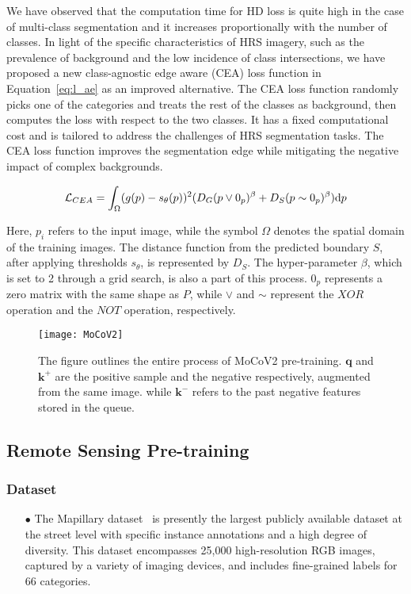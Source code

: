 \documentclass[journal]{IEEEtran}
\begin{document}
We have observed that the computation time for HD loss is quite high in the case of multi-class segmentation and it increases proportionally with the number of classes. In light of the specific characteristics of HRS imagery, such as the prevalence of background and the low incidence of class intersections, we have proposed a new class-agnostic edge aware (CEA) loss function in Equation~\ref{eq:l_ae} as an improved alternative. The CEA loss function randomly picks one of the categories and treats the rest of the classes as background, then computes the loss with respect to the two classes. It has a fixed computational cost and is tailored to address the challenges of HRS segmentation tasks. The CEA loss function improves the segmentation edge while mitigating the negative impact of complex backgrounds.

\begin{equation}
\small
    \mathcal{L}_{CEA} = \int_{\Omega}(g(p) - s_{\theta}(p))^2(D_{G}(p\vee0_{p})^\beta + D_{S}(p\sim0_{p})^\beta)\mathrm{d}p
\label{eq:l_ae}
\end{equation}

Here, $p_{i}$ refers to the input image, while the symbol $\Omega$ denotes the spatial domain of the training images. The distance function from the predicted boundary $S$, after applying thresholds $s_{\theta}$, is represented by $D_{S}$. The hyper-parameter $\beta$, which is set to 2 through a grid search, is also a part of this process. $0_{p}$ represents a zero matrix with the same shape as $P$, while $\vee$ and $\sim$ represent the $XOR$ operation and the $NOT$ operation, respectively.

\begin{figure*}[t]
    \centering
    \texttt{[image: MoCoV2]}
    \caption{The figure outlines the entire process of MoCoV2 pre-training. $\bm q$ and $\bm k^{+}$ are the positive sample and the negative respectively, augmented from the same image.  while $\bm k^{-}$ refers to the past negative features stored in the queue.}
    \label{fig:moco}
\end{figure*}


\subsection{Remote Sensing Pre-training}
\subsubsection{Dataset}
\begin{itemize}
\item[$\bullet$] The Mapillary dataset~\cite{neuhold2017mapillary} is presently the largest publicly available dataset at the street level with specific instance annotations and a high degree of diversity. This dataset encompasses 25,000 high-resolution RGB images, captured by a variety of imaging devices, and includes fine-grained labels for 66 categories.
\end{itemize}
\end{document}

